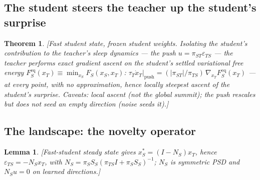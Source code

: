 \documentclass[10pt,letterpaper]{article}
\theoremstyle{plain}
\newtheorem{theorem}{Theorem}
\newtheorem{lemma}{Lemma}
\theoremstyle{remark}
\begin{document}
\subsection{The student steers the teacher up the student's surprise}
\begin{theorem}\label{thm:prioritized}
\textit{[Fast student state, frozen student weights. Isolating the student's
contribution to the teacher's sleep dynamics --- the push $u=\pi_{ST}\varepsilon_{TS}$
--- the teacher performs exact gradient ascent on the student's settled variational
free energy $F_S^{\mathrm{eq}}(x_T)\equiv\min_{x_S}F_S(x_S,x_T)$:
$\tau_T\dot x_T|_{\mathrm{push}}=(|\pi_{ST}|/\pi_{TS})\,\nabla_{x_T}F_S^{\mathrm{eq}}(x_T)$
--- at every point, with no approximation, hence locally steepest ascent of the
student's surprise. Caveats: local ascent (not the global summit); the push rescales
but does not seed an empty direction (noise seeds it).]}
\end{theorem}

\subsection{The landscape: the novelty operator}
\begin{lemma}\label{lem:novelty}
\textit{[Fast-student steady state gives $x_S^*=(I-N_S)x_T$, hence
$\varepsilon_{TS}=-N_S x_T$, with $N_S=\pi_S S_S(\pi_{TS}I+\pi_S S_S)^{-1}$; $N_S$ is
symmetric PSD and $N_S u=0$ on learned directions.]}
\end{lemma}
\end{document}
